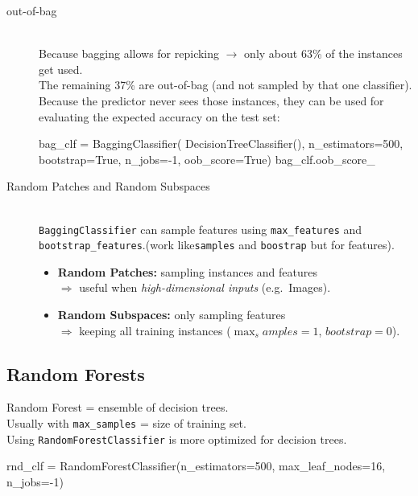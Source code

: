 \begin{description}
    \item[out-of-bag] \hfill\\
        Because bagging allows for repicking $\rightarrow$ only about 63\% of the
        instances get used.\\
        The remaining 37\% are out-of-bag (and not sampled by that one classifier).\\
        Because the predictor never sees those instances, they can be used for evaluating the expected accuracy on the test set:
        \begin{python}
            bag_clf = BaggingClassifier(
                DecisionTreeClassifier(), n_estimators=500,
                bootstrap=True, n_jobs=-1, oob_score=True)
            bag_clf.oob_score_
        \end{python}
    \item[Random Patches and Random Subspaces] \hfill\\
        \verb;BaggingClassifier; can sample features using \verb;max_features;
        and \verb;bootstrap_features;.(work like\verb;samples; and
        \verb;boostrap; but for features).\\
        \begin{itemize}
            \item \textbf{Random Patches:} sampling instances and features\\
            $\Rightarrow$ useful when \textit{high-dimensional inputs} (e.g.\ Images).
            \item \textbf{Random Subspaces:} only sampling features\\
            $\Rightarrow$ keeping all training instances ($\max_samples=1$, $bootstrap=0$).
        \end{itemize}
\end{description}

\subsection{Random Forests}
Random Forest = ensemble of decision trees.\\
Usually with \verb;max_samples; = size of training set.\\

Using \verb;RandomForestClassifier; is more optimized for decision trees.
\begin{python}
    rnd_clf = RandomForestClassifier(n_estimators=500,
                max_leaf_nodes=16, n_jobs=-1)
\end{python}

